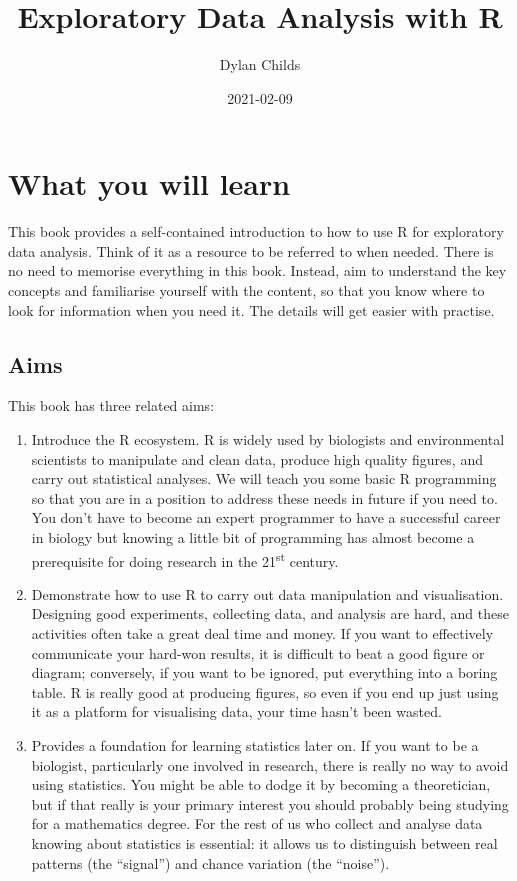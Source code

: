 \documentclass[
]{book}
\title{Exploratory Data Analysis with R}
\author{Dylan Childs}
\date{2021-02-09}
\begin{document}
\maketitle

{
\setcounter{tocdepth}{1}
\tableofcontents
}
\hypertarget{what-you-will-learn}{%
\chapter*{What you will learn}\label{what-you-will-learn}}

This book provides a self-contained introduction to how to use R for exploratory data analysis. Think of it as a resource to be referred to when needed. There is no need to memorise everything in this book. Instead, aim to understand the key concepts and familiarise yourself with the content, so that you know where to look for information when you need it. The details will get easier with practise.

\hypertarget{aims}{%
\section*{Aims}\label{aims}}

This book has three related aims:

\begin{enumerate}
\def\labelenumi{\arabic{enumi}.}
\item
  Introduce the R ecosystem. R is widely used by biologists and environmental scientists to manipulate and clean data, produce high quality figures, and carry out statistical analyses. We will teach you some basic R programming so that you are in a position to address these needs in future if you need to. You don't have to become an expert programmer to have a successful career in biology but knowing a little bit of programming has almost become a prerequisite for doing research in the 21\textsuperscript{st} century.
\item
  Demonstrate how to use R to carry out data manipulation and visualisation. Designing good experiments, collecting data, and analysis are hard, and these activities often take a great deal time and money. If you want to effectively communicate your hard-won results, it is difficult to beat a good figure or diagram; conversely, if you want to be ignored, put everything into a boring table. R is really good at producing figures, so even if you end up just using it as a platform for visualising data, your time hasn't been wasted.
\item
  Provides a foundation for learning statistics later on. If you want to be a biologist, particularly one involved in research, there is really no way to avoid using statistics. You might be able to dodge it by becoming a theoretician, but if that really is your primary interest you should probably being studying for a mathematics degree. For the rest of us who collect and analyse data knowing about statistics is essential: it allows us to distinguish between real patterns (the ``signal'') and chance variation (the ``noise'').
\end{enumerate}
\end{document}
